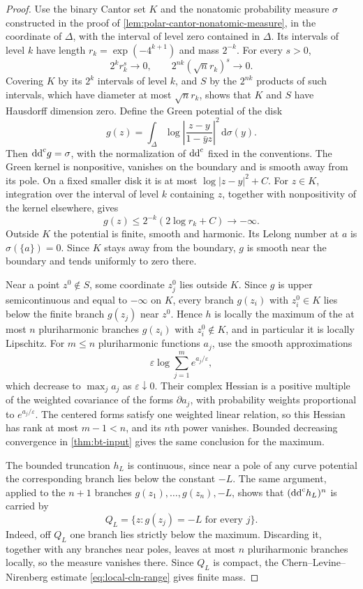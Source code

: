 \begin{proof}
Use the binary Cantor set $K$ and the nonatomic probability measure $\sigma$ constructed in the proof of \cref{lem:polar-cantor-nonatomic-measure}, in the coordinate of $\Delta$, with the interval of level zero contained in $\Delta$. Its intervals of level $k$ have length $r_k=\exp(-4^{k+1})$ and mass $2^{-k}$. For every $s>0$,
\[
 2^kr_k^s\longrightarrow0,\qquad
 2^{nk}(\sqrt n r_k)^s\longrightarrow0.
\]
Covering $K$ by its $2^k$ intervals of level $k$, and $S$ by the $2^{nk}$ products of such intervals, which have diameter at most $\sqrt nr_k$, shows that $K$ and $S$ have Hausdorff dimension zero. Define the Green potential of the disk
\[
 g(z)=\int_\Delta
       \log\left|\frac{z-y}{1-\bar yz}\right|^2\,\mathrm d\sigma(y).
\]
Then $\mathrm{dd}^{\mathrm{c}} g=\sigma$, with the normalization of $\mathrm{dd}^{\mathrm{c}}$ fixed in the conventions. The Green kernel is nonpositive, vanishes on the boundary and is smooth away from its pole. On a fixed smaller disk it is at most $\log|z-y|^2+C$. For $z\in K$, integration over the interval of level $k$ containing $z$, together with nonpositivity of the kernel elsewhere, gives
\[
 g(z)\leq2^{-k}(2\log r_k+C)\longrightarrow-\infty.
\]
Outside $K$ the potential is finite, smooth and harmonic. Its Lelong number at $a$ is $\sigma(\{a\})=0$. Since $K$ stays away from the boundary, $g$ is smooth near the boundary and tends uniformly to zero there.

Near a point $z^0\notin S$, some coordinate $z^0_j$ lies outside $K$. Since $g$ is upper semicontinuous and equal to $-\infty$ on $K$, every branch $g(z_i)$ with $z^0_i\in K$ lies below the finite branch $g(z_j)$ near $z^0$. Hence $h$ is locally the maximum of the at most $n$ pluriharmonic branches $g(z_i)$ with $z^0_i\notin K$, and in particular it is locally Lipschitz. For $m\leq n$ pluriharmonic functions $a_j$, use the smooth approximations
\[
 \varepsilon\log\sum_{j=1}^m e^{a_j/\varepsilon},
\]
which decrease to $\max_ja_j$ as $\varepsilon\downarrow0$. Their complex Hessian is a positive multiple of the weighted covariance of the forms $\partial a_j$, with probability weights proportional to $e^{a_j/\varepsilon}$. The centered forms satisfy one weighted linear relation, so this Hessian has rank at most $m-1<n$, and its $n$th power vanishes. Bounded decreasing convergence in \cref{thm:bt-input} gives the same conclusion for the maximum.

The bounded truncation $h_L$ is continuous, since near a pole of any curve potential the corresponding branch lies below the constant $-L$. The same argument, applied to the $n+1$ branches $g(z_1),\ldots,g(z_n),-L$, shows that $(\mathrm{dd}^{\mathrm{c}} h_L)^n$ is carried by
\[
 Q_L=\{z:g(z_j)=-L\text{ for every }j\}.
\]
Indeed, off $Q_L$ one branch lies strictly below the maximum. Discarding it, together with any branches near poles, leaves at most $n$ pluriharmonic branches locally, so the measure vanishes there. Since $Q_L$ is compact, the Chern--Levine--Nirenberg estimate \eqref{eq:local-cln-range} gives finite mass.


\end{proof}
